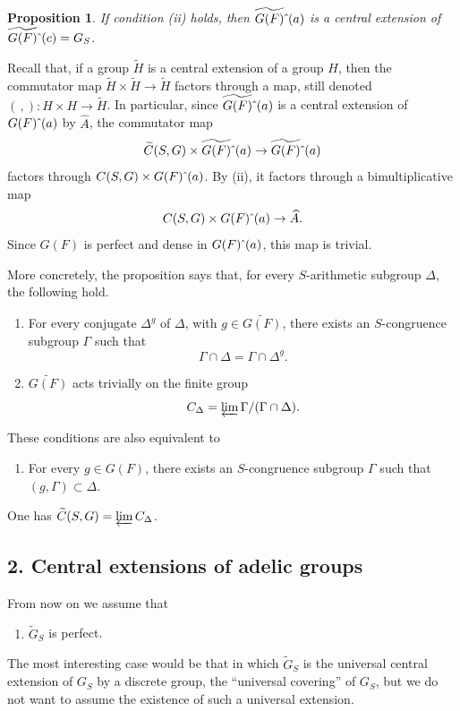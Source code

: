\documentclass[10pt]{amsart}
\theoremstyle{plain}
\newtheorem{proposition}{Proposition}
\theoremstyle{definition}
\begin{document}
\begin{proposition}
If condition (ii) holds, then $\widetilde{G(F)}\hat{\mkern6mu}(a)$ is a central extension of $\widetilde{G(F)}\hat{\mkern6mu}(c)=G_S$.
\end{proposition}

Recall that, if a group $\widetilde H$ is a central extension of a group $H$, then the commutator map $\widetilde H\times\widetilde H\to\widetilde H$ factors through a map, still denoted $(\,,):H\times H\to\widetilde H$. In particular, since $\widetilde{G(F)}\hat{\mkern6mu}(a)$ is a central extension of $G(F)\hat{\mkern6mu}(a)$ by $\widehat A$, the commutator map
\[
\widetilde C(S,G)\times\widetilde{G(F)}\hat{\mkern6mu}(a)\to\widetilde{G(F)}\hat{\mkern6mu}(a)
\]
factors through $C(S,G)\times G(F)\hat{\mkern6mu}(a)$. By (ii), it factors through a bimultiplicative map
\[
C(S,G)\times G(F)\hat{\mkern6mu}(a)\to\widehat A.
\]
Since $G(F)$ is perfect and dense in $G(F)\hat{\mkern6mu}(a)$, this map is trivial.

More concretely, the proposition says that, for every $S$-arithmetic subgroup $\Delta$, the following hold.
\begin{enumerate}
\item[(1a)] For every conjugate $\Delta^g$ of $\Delta$, with $g\in\widetilde{G(F)}$, there exists an $S$-congruence subgroup $\Gamma$ such that
\[
\Gamma\cap\Delta=\Gamma\cap\Delta^g.
\]
\item[(1b)] $\widetilde{G(F)}$ acts trivially on the finite group
\[
C_\Delta=\varprojlim\Gamma/(\Gamma\cap\Delta).
\]
\end{enumerate}
These conditions are also equivalent to
\begin{enumerate}
\item[(1c)] For every $g\in G(F)$, there exists an $S$-congruence subgroup $\Gamma$ such that $(g,\Gamma)\subset\Delta$.
\end{enumerate}
One has $\widetilde C(S,G)=\varprojlim C_\Delta$.

\subsection*{2. Central extensions of adelic groups}

From now on we assume that
\begin{enumerate}
\item[(iii)] $\widetilde G_S$ is perfect.
\end{enumerate}

The most interesting case would be that in which $\widetilde G_S$ is the universal central extension of $G_S$ by a discrete group, the ``universal covering'' of $G_S$, but we do not want to assume the existence of such a universal extension.
\end{document}
